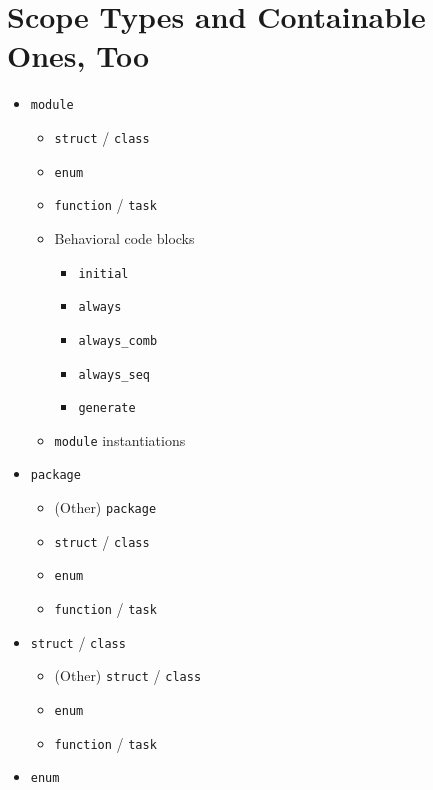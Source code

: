 \documentclass{article}
\begin{document}
	\section{Scope Types and Containable Ones, Too}
	\begin{itemize}
		\item \texttt{module}
		\begin{itemize}
			\item \texttt{struct} / \texttt{class}
			\item \texttt{enum}
			\item \texttt{function} / \texttt{task}
			\item Behavioral code blocks
			\begin{itemize}
				\item \texttt{initial}
				\item \texttt{always}
				\item \texttt{always\_comb}
				\item \texttt{always\_seq}
				\item \texttt{generate}
			\end{itemize}
			\item \texttt{module} instantiations
		\end{itemize}

		\item \texttt{package}
		\begin{itemize}
			\item (Other) \texttt{package}
			\item \texttt{struct} / \texttt{class}
			\item \texttt{enum}
			\item \texttt{function} / \texttt{task}
		\end{itemize}

		\item \texttt{struct} / \texttt{class}
		\begin{itemize}
			\item (Other) \texttt{struct} / \texttt{class}
			\item \texttt{enum}
			\item \texttt{function} / \texttt{task}
		\end{itemize}

		\item \texttt{enum}


\end{itemize}
\end{document}
